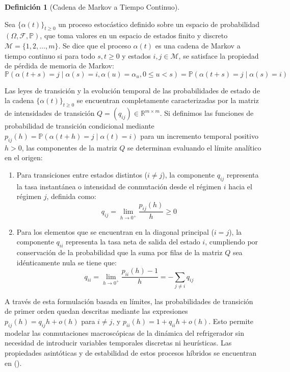 \documentclass[
  spanish,
  us-letterpaper,
]{scrreprt}
\providecommand{\tightlist}{%
  \setlength{\itemsep}{0pt}\setlength{\parskip}{0pt}}
\numberwithin{equation}{section}
\theoremstyle{plain}
\theoremstyle{plain}
\theoremstyle{definition}
\newtheorem{definition}{Definición}[chapter]
\theoremstyle{plain}
\theoremstyle{remark}
\begin{document}
\begin{definition}[Cadena de Markov a Tiempo
Continuo]\protect\hypertarget{def-cadena-markov}{}\label{def-cadena-markov}

Sea \(\{\alpha(t)\}_{t \ge 0}\) un proceso estocástico definido sobre un
espacio de probabilidad \((\Omega, \mathcal{F}, \mathbb{P})\), que toma
valores en un espacio de estados finito y discreto
\(\mathcal{M} = \{1, 2, \dots, m\}\). Se dice que el proceso
\(\alpha(t)\) es una cadena de Markov a tiempo continuo si para todo
\(s, t \ge 0\) y estados \(i, j \in \mathcal{M}\), se satisface la
propiedad de pérdida de memoria de Markov: \[
\mathbb{P}(\alpha(t+s) = j \mid \alpha(s) = i, \alpha(u) = \alpha_u, 0 \le u < s) = \mathbb{P}(\alpha(t+s) = j \mid \alpha(s) = i)
\]

\end{definition}

Las leyes de transición y la evolución temporal de las probabilidades de
estado de la cadena \(\{\alpha(t)\}_{t \ge 0}\) se encuentran
completamente caracterizadas por la matriz de intensidades de transición
\(Q = (q_{ij}) \in \mathbb{R}^{m \times m}\). Si definimos las funciones
de probabilidad de transición condicional mediante
\(p_{ij}(h) = \mathbb{P}(\alpha(t+h) = j \mid \alpha(t) = i)\) para un
incremento temporal positivo \(h > 0\), las componentes de la matriz
\(Q\) se determinan evaluando el límite analítico en el origen:

\begin{enumerate}
\def\labelenumi{\arabic{enumi}.}
\tightlist
\item
  Para transiciones entre estados distintos (\(i \neq j\)), la
  componente \(q_{ij}\) representa la tasa instantánea o intensidad de
  conmutación desde el régimen \(i\) hacia el régimen \(j\), definida
  como: \[
  q_{ij} = \lim_{h \to 0^+} \frac{p_{ij}(h)}{h} \ge 0
  \]
\item
  Para los elementos que se encuentran en la diagonal principal
  (\(i = j\)), la componente \(q_{ii}\) representa la tasa neta de
  salida del estado \(i\), cumpliendo por conservación de la
  probabilidad que la suma por filas de la matriz \(Q\) sea
  idénticamente nula se tiene que: \[
  q_{ii} = \lim_{h \to 0^+} \frac{p_{ii}(h) - 1}{h} = -\sum_{j \neq i} q_{ij}
  \]
\end{enumerate}

A través de esta formulación basada en límites, las probabilidades de
transición de primer orden quedan descritas mediante las expresiones
\(p_{ij}(h) = q_{ij}h + o(h)\) para \(i \neq j\), y
\(p_{ii}(h) = 1 + q_{ii}h + o(h)\). Esto permite modelar las
conmutaciones macroscópicas de la dinámica del refrigerador sin
necesidad de introducir variables temporales discretas ni heurísticas.
Las propiedades asintóticas y de estabilidad de estos procesos híbridos
se encuentran en ().
\end{document}
